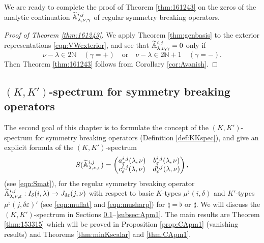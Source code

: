 We are ready to complete the proof
 of Theorem \ref{thm:161243}
 on the zeros of the analytic continuation
 ${\widetilde{\mathbb{A}}}_{{\lambda},{\nu},{\gamma}}^{{i,j}}$
 of regular symmetry breaking operators.  
\begin{proof}
[Proof of Theorem \ref{thm:161243}]
We apply Theorem \ref{thm:genbasis}
 to the exterior representations
 \eqref{eqn:VWexterior},
 and see that  
${\widetilde{\mathbb{A}}}_{{\lambda},{\nu},{\gamma}}^{{i,j}}=0$
 only if 
\begin{equation}
\label{eqn:AC}
\nu-\lambda \in 2 {\mathbb{N}}
\quad
(\gamma=+)
\quad
\text{or}
\quad
\nu-\lambda \in 2 {\mathbb{N}}+1
\quad
(\gamma=-).  
\end{equation}
Then Theorem \ref{thm:161243} follows from
 Corollary \ref{cor:Avanish}.  
\end{proof}


\subsection{$(K,K')$-spectrum for symmetry breaking operators}
\label{subsec:Kspec}

The second goal of this chapter is to formulate the concept
 of the $(K,K')$-spectrum
 for symmetry breaking operators (Definition \ref{def:KKspec}), 
 and give an explicit formula
 of the $(K,K')$-spectrum
\begin{equation}
\label{eqn:SAabcd}
S({\widetilde{\mathbb{A}}}_{{\lambda},{\nu},{\varepsilon}}^{{i,j}})
=
\begin{pmatrix}
a_{\varepsilon}^{i,j}(\lambda,\nu)
&
b_{\varepsilon}^{i,j}(\lambda,\nu)
\\
c_{\varepsilon}^{i,j}(\lambda,\nu)
&
d_{\varepsilon}^{i,j}(\lambda,\nu)
\end{pmatrix}, 
\end{equation}
 (see \eqref{eqn:Smat}), 
 for the regular symmetry breaking operator
$
    {\widetilde{\mathbb{A}}}_{{\lambda},{\nu},{\varepsilon}}^{{i,j}}
    :
    I_{\delta}(i,\lambda)
    \to 
    J_{\delta \varepsilon}(j,\nu)
$
 with respect to basic $K$-types $\mu^{\natural}(i,\delta)$
 and $K'$-types $\mu^{\natural}(j,\delta \varepsilon)'$
 (see \eqref{eqn:muflat} and \eqref{eqn:musharp})
 for $\natural=\flat$ or $\sharp$.  
We will discuss the $(K,K')$-spectrum
 in Sections \ref{subsec:Kspec}--\ref{subsec:Apm1}.  
The main results are Theorem \ref{thm:153315}
 which will be proved in  Proposition \ref{prop:CApm1} (vanishing results)
 and Theorems \ref{thm:minKscalar}
 and \ref{thm:CApm1}.  




